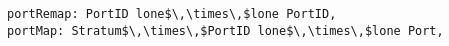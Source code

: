 \lstset{frame=tb, aboveskip=12pt, belowskip=-3pt, breaklines=true, basicstyle=\small\ttfamily, tabsize=2, mathescape=true}
\begin{lstlisting}[caption={structure.als, lines 162-163}, label=alloy:PART_PORT_REMAP, captionpos=b]
portRemap: PortID lone$\,\times\,$lone PortID,
portMap: Stratum$\,\times\,$PortID lone$\,\times\,$lone Port,
\end{lstlisting}